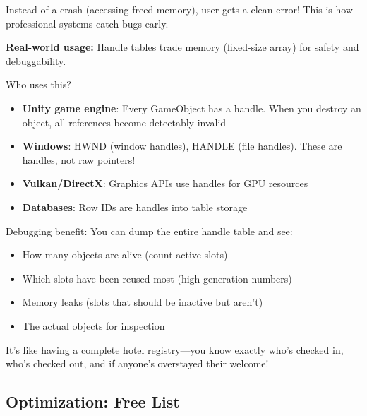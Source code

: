 Instead of a crash (accessing freed memory), user gets a clean error! This is how professional systems catch bugs early.

\begin{tipbox}
\textbf{Real-world usage:} Handle tables trade memory (fixed-size array) for safety and debuggability.

Who uses this?
\begin{itemize}
    \item \textbf{Unity game engine}: Every GameObject has a handle. When you destroy an object, all references become detectably invalid
    \item \textbf{Windows}: HWND (window handles), HANDLE (file handles). These are handles, not raw pointers!
    \item \textbf{Vulkan/DirectX}: Graphics APIs use handles for GPU resources
    \item \textbf{Databases}: Row IDs are handles into table storage
\end{itemize}

Debugging benefit: You can dump the entire handle table and see:
\begin{itemize}
    \item How many objects are alive (count active slots)
    \item Which slots have been reused most (high generation numbers)
    \item Memory leaks (slots that should be inactive but aren't)
    \item The actual objects for inspection
\end{itemize}

It's like having a complete hotel registry---you know exactly who's checked in, who's checked out, and if anyone's overstayed their welcome!
\end{tipbox}

\subsection{Optimization: Free List}


